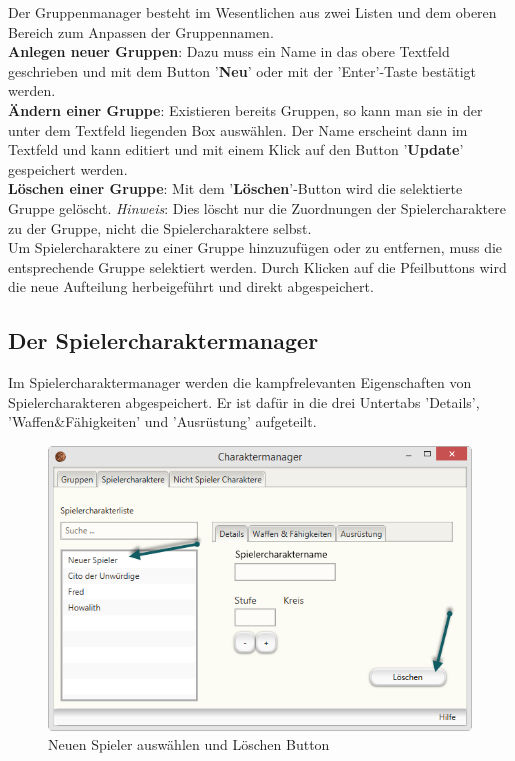 \documentclass[11pt, a4paper, german]{article}
\begin{document}
Der Gruppenmanager besteht im Wesentlichen aus zwei Listen und dem oberen Bereich zum Anpassen der Gruppennamen.\\

\textbf{Anlegen neuer Gruppen}: Dazu muss ein Name in das obere Textfeld geschrieben und mit dem Button '\textbf{Neu}' oder mit der 'Enter'-Taste bestätigt werden.\\

\textbf{Ändern einer Gruppe}: Existieren bereits Gruppen, so kann man sie in der unter dem Textfeld liegenden Box auswählen. Der Name erscheint dann im Textfeld und kann editiert und mit einem Klick auf den Button '\textbf{Update}' gespeichert werden. \\

\textbf{Löschen einer Gruppe}: Mit dem '\textbf{Löschen}'-Button wird die selektierte Gruppe gelöscht. \textit{Hinweis}: Dies löscht nur die Zuordnungen der Spielercharaktere zu der Gruppe, nicht die Spielercharaktere selbst.\\

Um Spielercharaktere zu einer Gruppe hinzuzufügen oder zu entfernen, muss die entsprechende Gruppe selektiert werden. Durch Klicken auf die Pfeilbuttons wird die neue Aufteilung herbeigeführt und direkt abgespeichert.

\subsection{Der Spielercharaktermanager}\label{subsection:Spielercharaktermanager}
Im Spielercharaktermanager werden die kampfrelevanten Eigenschaften von Spielercharakteren abgespeichert. 
Er ist dafür in die drei Untertabs 'Details', 'Waffen\&Fähigkeiten' und 'Ausrüstung' aufgeteilt.\\
\begin{figure}[h!]
\centering
\includegraphics[width=1\linewidth]{Bilder/Charaktermanager1}
\caption{Neuen Spieler auswählen und Löschen Button}
\label{fig:Charaktermanager1}
\end{figure}
\end{document}
